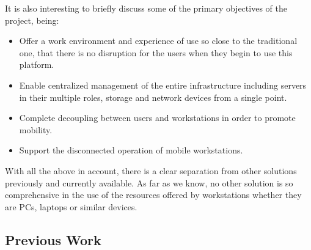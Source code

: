 
\newpage

It is also interesting to briefly discuss some of the primary objectives of the project, being:
\begin{itemize}
	\item Offer a work environment and experience of use so close to the traditional one, that there is no disruption for the users when they begin to use this platform.
	\item Enable centralized management of the entire infrastructure including servers in their multiple roles, storage and network devices from a single point.
	\item Complete decoupling between users and workstations in order to promote mobility.
	\item Support the disconnected operation of mobile workstations.
\end{itemize}

With all the above in account, there is a clear separation from other solutions previously and currently available. As far as we know, no other solution is so comprehensive in the use of the resources offered by workstations whether they are PCs, laptops or similar devices.





\subsection{Previous Work} %
\label{sub:previous_work}

